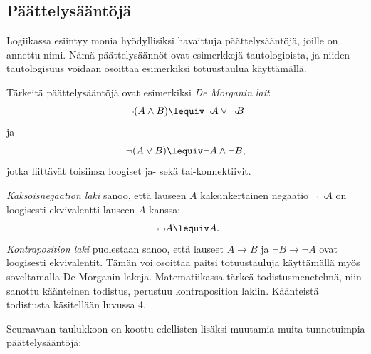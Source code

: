 \bigskip


\subsection*{Päättelysääntöjä} Logiikassa esiintyy monia hyödyllisiksi havaittuja päättelysääntöjä, joille on annettu nimi. Nämä päättelysäännöt ovat esimerkkejä tautologioista, ja niiden tautologisuus voidaan osoittaa esimerkiksi totuustaulua käyttämällä.

Tärkeitä päättelysääntöjä ovat esimerkiksi {\em De Morganin lait}
\[
\lnot(A \land B) \lequiv \lnot A \lor \lnot B
\]
ja
\[
\lnot(A \lor B) \lequiv \lnot A \land \lnot B,
\]
jotka liittävät toisiinsa loogiset ja- sekä tai-konnektiivit.

{\em Kaksoisnegaation laki} sanoo, että lauseen $A$ kaksinkertainen negaatio $\lnot \lnot A$ on loogisesti ekvivalentti lauseen $A$ kanssa:
\[
\lnot \lnot A \lequiv A.
\]
{\em Kontraposition laki} puolestaan sanoo, että lauseet $A\to B$ ja $\lnot B \to \lnot A$ ovat loogisesti ekvivalentit. Tämän voi osoittaa paitsi totuustauluja käyttämällä myös soveltamalla De Morganin lakeja.
Matematiikassa tärkeä todistusmenetelmä, niin sanottu käänteinen todistus, perustuu kontraposition lakiin. Käänteistä todistusta käsitellään luvussa 4.


Seuraavaan taulukkoon on koottu edellisten lisäksi muutamia muita tunnetuimpia päättelysääntöjä: %

\bigskip


